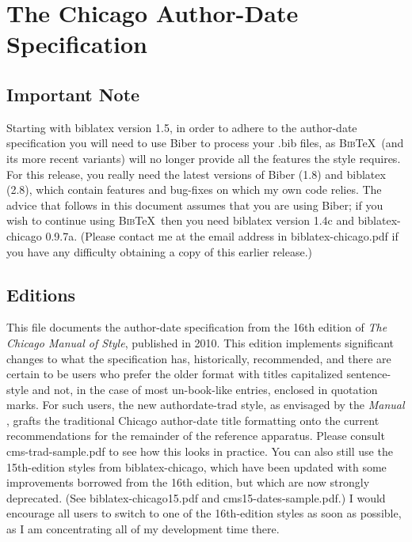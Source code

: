 \documentclass[a4paper,12pt]{report}
\begin{document}
\section*{The Chicago Author-Date Specification}
\label{sec:spec}

\subsection*{Important Note}
\label{bibernote}

Starting with \textsf{biblatex} version 1.5, in order to adhere to the
author-date specification you will need to use \textsf{Biber} to
process your .bib files, as \textsc{Bib}\TeX\ (and its more recent
variants) will no longer provide all the features the style requires.
For this release, you really need the latest versions of
\textsf{Biber} (1.8) and \textsf{biblatex} (2.8), which contain
features and bug-fixes on which my own code relies.  The advice that
follows in this document assumes that you are using \textsf{Biber}; if
you wish to continue using \textsc{Bib}\TeX\ then you need
\textsf{biblatex} version 1.4c and \textsf{biblatex-chicago} 0.9.7a.
(Please contact me at the email address in
\textsf{biblatex-chicago.pdf} if you have any difficulty obtaining a
copy of this earlier release.)

\subsection*{Editions}
\label{editions}

This file documents the author-date specification from the 16th
edition of \emph{The Chicago Manual of Style}, published in 2010.
This edition implements significant changes to what the specification
has, historically, recommended, and there are certain to be users who
prefer the older format with titles capitalized sentence-style and
not, in the case of most un-book-like entries, enclosed in quotation
marks.  For such users, the new \textsf{authordate-trad} style, as
envisaged by the \emph{Manual} \autocite*[15.45]{chicago:manual},
grafts the traditional Chicago author-date title formatting onto the
current recommendations for the remainder of the reference apparatus.
Please consult \textsf{cms-trad-sample.pdf} to see how this looks in
practice.  You can also still use the 15th-edition styles from
\textsf{biblatex-chicago}, which have been updated with some
improvements borrowed from the 16th edition, but which are now
strongly deprecated.  (See \textsf{biblatex-chicago15.pdf} and
\textsf{cms15-dates-sample.pdf}.)  I would encourage all users to
switch to one of the 16th-edition styles as soon as possible, as I am
concentrating all of my development time there.
\end{document}
